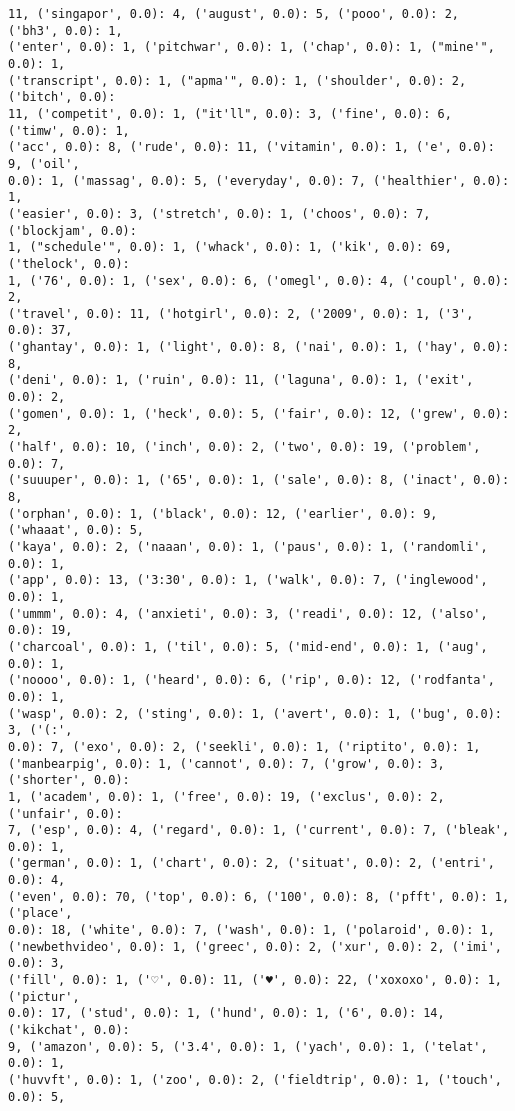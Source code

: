 \documentclass[11pt]{article}
\begin{document}
\begin{Verbatim}[commandchars=\\\{\}]
11, ('singapor', 0.0): 4, ('august', 0.0): 5, ('pooo', 0.0): 2, ('bh3', 0.0): 1,
('enter', 0.0): 1, ('pitchwar', 0.0): 1, ('chap', 0.0): 1, ("mine'", 0.0): 1,
('transcript', 0.0): 1, ("apma'", 0.0): 1, ('shoulder', 0.0): 2, ('bitch', 0.0):
11, ('competit', 0.0): 1, ("it'll", 0.0): 3, ('fine', 0.0): 6, ('timw', 0.0): 1,
('acc', 0.0): 8, ('rude', 0.0): 11, ('vitamin', 0.0): 1, ('e', 0.0): 9, ('oil',
0.0): 1, ('massag', 0.0): 5, ('everyday', 0.0): 7, ('healthier', 0.0): 1,
('easier', 0.0): 3, ('stretch', 0.0): 1, ('choos', 0.0): 7, ('blockjam', 0.0):
1, ("schedule'", 0.0): 1, ('whack', 0.0): 1, ('kik', 0.0): 69, ('thelock', 0.0):
1, ('76', 0.0): 1, ('sex', 0.0): 6, ('omegl', 0.0): 4, ('coupl', 0.0): 2,
('travel', 0.0): 11, ('hotgirl', 0.0): 2, ('2009', 0.0): 1, ('3', 0.0): 37,
('ghantay', 0.0): 1, ('light', 0.0): 8, ('nai', 0.0): 1, ('hay', 0.0): 8,
('deni', 0.0): 1, ('ruin', 0.0): 11, ('laguna', 0.0): 1, ('exit', 0.0): 2,
('gomen', 0.0): 1, ('heck', 0.0): 5, ('fair', 0.0): 12, ('grew', 0.0): 2,
('half', 0.0): 10, ('inch', 0.0): 2, ('two', 0.0): 19, ('problem', 0.0): 7,
('suuuper', 0.0): 1, ('65', 0.0): 1, ('sale', 0.0): 8, ('inact', 0.0): 8,
('orphan', 0.0): 1, ('black', 0.0): 12, ('earlier', 0.0): 9, ('whaaat', 0.0): 5,
('kaya', 0.0): 2, ('naaan', 0.0): 1, ('paus', 0.0): 1, ('randomli', 0.0): 1,
('app', 0.0): 13, ('3:30', 0.0): 1, ('walk', 0.0): 7, ('inglewood', 0.0): 1,
('ummm', 0.0): 4, ('anxieti', 0.0): 3, ('readi', 0.0): 12, ('also', 0.0): 19,
('charcoal', 0.0): 1, ('til', 0.0): 5, ('mid-end', 0.0): 1, ('aug', 0.0): 1,
('noooo', 0.0): 1, ('heard', 0.0): 6, ('rip', 0.0): 12, ('rodfanta', 0.0): 1,
('wasp', 0.0): 2, ('sting', 0.0): 1, ('avert', 0.0): 1, ('bug', 0.0): 3, ('(:',
0.0): 7, ('exo', 0.0): 2, ('seekli', 0.0): 1, ('riptito', 0.0): 1,
('manbearpig', 0.0): 1, ('cannot', 0.0): 7, ('grow', 0.0): 3, ('shorter', 0.0):
1, ('academ', 0.0): 1, ('free', 0.0): 19, ('exclus', 0.0): 2, ('unfair', 0.0):
7, ('esp', 0.0): 4, ('regard', 0.0): 1, ('current', 0.0): 7, ('bleak', 0.0): 1,
('german', 0.0): 1, ('chart', 0.0): 2, ('situat', 0.0): 2, ('entri', 0.0): 4,
('even', 0.0): 70, ('top', 0.0): 6, ('100', 0.0): 8, ('pfft', 0.0): 1, ('place',
0.0): 18, ('white', 0.0): 7, ('wash', 0.0): 1, ('polaroid', 0.0): 1,
('newbethvideo', 0.0): 1, ('greec', 0.0): 2, ('xur', 0.0): 2, ('imi', 0.0): 3,
('fill', 0.0): 1, ('♡', 0.0): 11, ('♥', 0.0): 22, ('xoxoxo', 0.0): 1, ('pictur',
0.0): 17, ('stud', 0.0): 1, ('hund', 0.0): 1, ('6', 0.0): 14, ('kikchat', 0.0):
9, ('amazon', 0.0): 5, ('3.4', 0.0): 1, ('yach', 0.0): 1, ('telat', 0.0): 1,
('huvvft', 0.0): 1, ('zoo', 0.0): 2, ('fieldtrip', 0.0): 1, ('touch', 0.0): 5,

\end{Verbatim}
\end{document}
